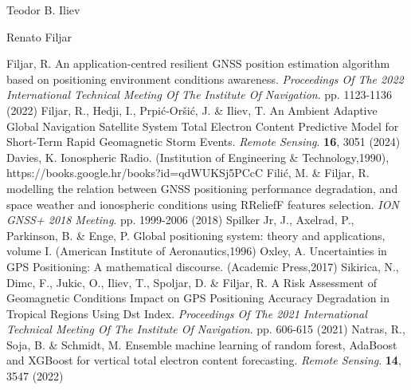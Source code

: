 \documentclass[sn-mathphys-num]{sn-jnl}%
\begin{document}
Teodor B. Iliev

Renato Filjar


\begin{thebibliography}{000}
Filjar, R. An application-centred resilient GNSS position estimation algorithm based on positioning environment conditions awareness. {\em Proceedings Of The 2022 International Technical Meeting Of The Institute Of Navigation}. pp. 1123-1136 (2022)
Filjar, R., Hedji, I., Prpić-Oršić, J. \& Iliev, T. An Ambient Adaptive Global Navigation Satellite System Total Electron Content Predictive Model for Short-Term Rapid Geomagnetic Storm Events. {\em Remote Sensing}. \textbf{16}, 3051 (2024)
Davies, K. Ionospheric Radio. (Institution of Engineering & Technology,1990), https://books.google.hr/books?id=qdWUKSj5PCcC
Filić, M. \& Filjar, R. modelling the relation between GNSS positioning performance degradation, and space weather and ionospheric conditions using RReliefF features selection. {\em ION GNSS+ 2018 Meeting}. pp. 1999-2006 (2018)
Spilker Jr, J., Axelrad, P., Parkinson, B. \& Enge, P. Global positioning system: theory and applications, volume I. (American Institute of Aeronautics,1996)
Oxley, A. Uncertainties in GPS Positioning: A mathematical discourse. (Academic Press,2017)
Sikirica, N., Dimc, F., Jukic, O., Iliev, T., Spoljar, D. \& Filjar, R. A Risk Assessment of Geomagnetic Conditions Impact on GPS Positioning Accuracy Degradation in Tropical Regions Using Dst Index. {\em Proceedings Of The 2021 International Technical Meeting Of The Institute Of Navigation}. pp. 606-615 (2021)
Natras, R., Soja, B. \& Schmidt, M. Ensemble machine learning of random forest, AdaBoost and XGBoost for vertical total electron content forecasting. {\em Remote Sensing}. \textbf{14}, 3547 (2022)

\end{thebibliography}
\end{document}
